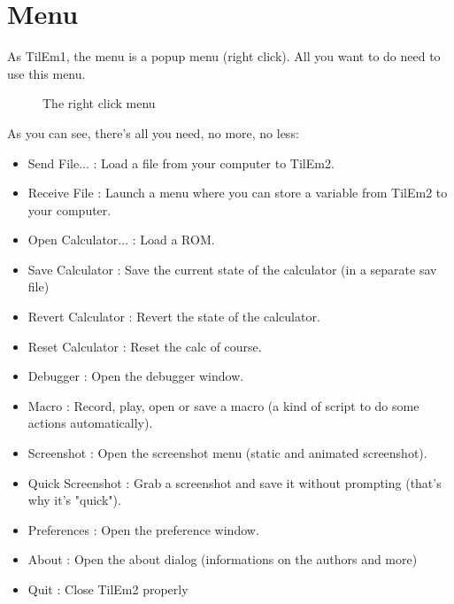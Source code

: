 \documentclass[10pt]{report}
\begin{document}
\section{Menu}
As TilEm1, the menu is a popup menu (right click).\newline
All you want to do need to use this menu.\newline
\begin{figure}[H]
\centering
{}
\caption{The right click menu}
\end{figure}
As you can see, there's all you need, no more, no less:\newline
\begin{itemize}
\item	Send File... : Load a file from your computer to TilEm2.
\item	Receive File : Launch a menu where you can store a variable from TilEm2 to your computer.
\item	Open Calculator... : Load a ROM.
\item	Save Calculator : Save the current state of the calculator (in a separate sav file)
\item	Revert Calculator : Revert the state of the calculator.
\item	Reset Calculator : Reset the calc of course.
\item	Debugger : Open the debugger window.
\item	Macro : Record, play, open or save a macro (a kind of script to do some actions automatically).
\item	Screenshot : Open the screenshot menu (static and animated screenshot).
\item	Quick Screenshot : Grab a screenshot and save it without prompting (that's why it's "quick").
\item	Preferences : Open the preference window.
\item	About : Open the about dialog (informations on the authors and more)
\item	Quit : Close TilEm2 properly
\end{itemize}
\end{document}
